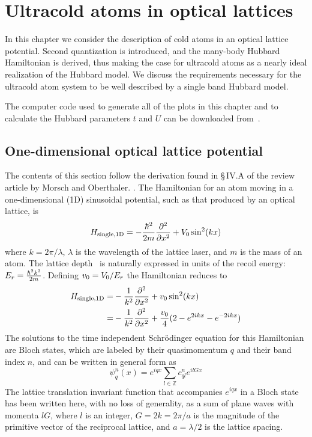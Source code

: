 \chapter{Ultracold atoms in optical lattices}
\label{chap:atomsinlattices}

In this chapter we consider the description of cold atoms in an optical lattice
potential.    Second quantization is introduced, and the many-body Hubbard
Hamiltonian is derived, thus making the case for ultracold atoms as a nearly
ideal realization of the Hubbard model.  
We discuss the requirements necessary for the ultracold atom system to be well
described by a single band Hubbard model. 

The computer code used to generate all of the plots in this chapter and to
calculate the Hubbard parameters $t$ and $U$ can be downloaded
from~\cite{PedroMDuarte:11612}. 


\section{One-dimensional optical lattice potential}

The contents of this section follow the derivation found in \S\,IV.A of the
review article by Morsch and Oberthaler.  \cite{RevModPhys.78.179}.  The
Hamiltonian for an atom moving in a one-dimensional (1D) sinusoidal potential,
such as that produced by an optical lattice, is 
\begin{equation}
  H_{\text{single,1D}} = 
  - \frac{\hbar^{2}}{2m} \frac{\partial^{2}}{\partial x^{2}} 
  + V_{0}\sin^{2}(kx) 
 \label{eq:Hsingle1D}
\end{equation}
where $k=2\pi/\lambda$, $\lambda$ is the wavelength of the lattice laser, and
$m$ is the mass of an atom.  The lattice depth \vo\ is naturally expressed in
units of the recoil energy: $E_{r}=\frac{\hbar^{2}k^{2}}{2m}$.  Defining
$v_{0}=V_{0}/E_{r}$ the Hamiltonian reduces to  
\begin{equation}
\begin{split}
  H_{\text{single,1D}}= &
    -\frac{1}{k^{2}} \frac{\partial^{2}}{\partial x^{2}} 
    + v_{0}\sin^{2}(kx) \\
           = &
    -\frac{1}{k^{2}} \frac{\partial^{2}}{\partial x^{2}} 
    + \frac{v_{0}}{4}(2 - e^{2ikx} - e^{-2ikx} )  \\
\end{split}
\end{equation}
The solutions to the time independent Schr\"{o}dinger equation for this
Hamiltonian are Bloch states, which are labeled by their quasimomentum $q$ and
their band index $n$, and can be written in general form as 
\begin{equation}
  \psi_{q}^{n}(x) = e^{iqx} \sum_{l \in \mathbb{Z}} c_{ql}^{n} e^{ilGx}
  \label{eq:blochstate}
\end{equation}
The lattice translation invariant function that accompanies $e^{iqx}$ in a
Bloch state has been written here, with no loss of generality, as a sum of
plane waves with momenta $lG$,  where $l$ is an integer, $G=2k=2\pi/a$  is the
magnitude of the primitive vector of the reciprocal lattice,  and $a=\lambda/2$
is the lattice spacing. 

